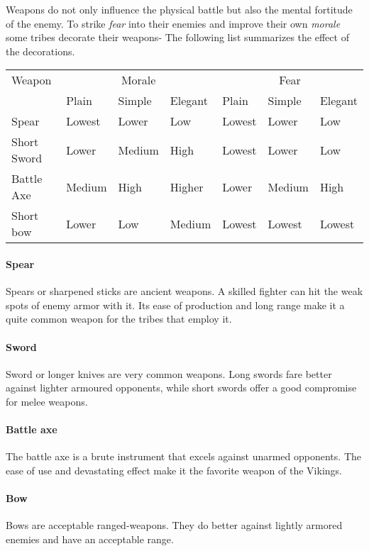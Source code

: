 Weapons do not only influence the physical battle but also the mental fortitude
of the enemy. To strike \emph{fear} into their enemies and improve their own
\emph{morale} some tribes decorate their weapons- The following list summarizes
the effect of the decorations.

\begin{longtable}{l ll ll ll}
	\toprule
	Weapon
	 & \multicolumn{3}{c}{Morale}
	 & \multicolumn{3}{c}{Fear}
	\\
	 & Plain                      & Simple & Elegant
	 & Plain                      & Simple & Elegant \\
	\midrule
	Spear
	 & Lowest                     & Lower  & Low
	 & Lowest                     & Lower  & Low     \\
	Short Sword
	 & Lower                      & Medium & High
	 & Lowest                     & Lower  & Low     \\
	Battle Axe
	 & Medium                     & High   & Higher
	 & Lower                      & Medium & High    \\
	Short bow
	 & Lower                      & Low    & Medium
	 & Lowest                     & Lowest & Lowest  \\
	\bottomrule
\end{longtable}

\paragraph{Spear}
Spears or sharpened sticks are ancient weapons. A skilled fighter can hit the
weak spots of enemy armor with it. Its ease of production and long range make
it a quite common weapon for the tribes that employ it.

\paragraph{Sword}
Sword or longer knives are very common weapons. Long swords fare better against
lighter armoured opponents, while short swords offer a good compromise for
melee weapons.

\paragraph{Battle axe}
The battle axe is a brute instrument that excels against unarmed opponents. The
ease of use and devastating effect make it the favorite weapon of the
\gls{Vikings}.

\paragraph{Bow}
Bows are acceptable ranged-weapons. They do better against lightly armored
enemies and have an acceptable range.

